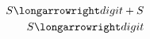 \documentclass[preview]{standalone}
\begin{document}
\begin{align*}
S \longarrowright digit + S \\ S \longarrowright digit
\end{align*}
\end{document}
